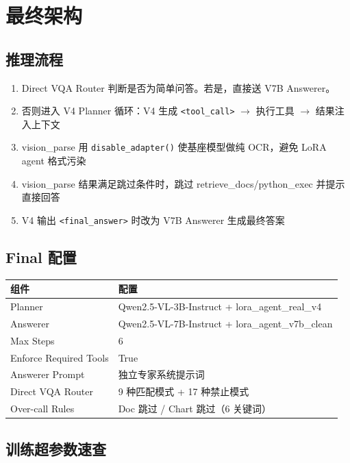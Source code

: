 \documentclass[12pt,a4paper]{ctexart}
\begin{document}
\section{最终架构}

\subsection{推理流程}

\begin{enumerate}[nosep]
  \item Direct VQA Router 判断是否为简单问答。若是，直接送 V7B Answerer。
  \item 否则进入 V4 Planner 循环：V4 生成 \texttt{<tool\_call>} $\rightarrow$ 执行工具 $\rightarrow$ 结果注入上下文
  \item vision\_parse 用 \texttt{disable\_adapter()} 使基座模型做纯 OCR，避免 LoRA agent 格式污染
  \item vision\_parse 结果满足跳过条件时，跳过 retrieve\_docs/python\_exec 并提示直接回答
  \item V4 输出 \texttt{<final\_answer>} 时改为 V7B Answerer 生成最终答案
\end{enumerate}

\subsection{Final 配置}

\begin{table}[H]
\centering
\begin{tabular}{ll}
\toprule
组件 & 配置 \\
\midrule
Planner & Qwen2.5-VL-3B-Instruct + lora\_agent\_real\_v4 \\
Answerer & Qwen2.5-VL-7B-Instruct + lora\_agent\_v7b\_clean \\
Max Steps & 6 \\
Enforce Required Tools & True \\
Answerer Prompt & 独立专家系统提示词 \\
Direct VQA Router & 9 种匹配模式 + 17 种禁止模式 \\
Over-call Rules & Doc 跳过 / Chart 跳过（6 关键词） \\
\bottomrule
\end{tabular}
\end{table}

\subsection{训练超参数速查}
\end{document}
